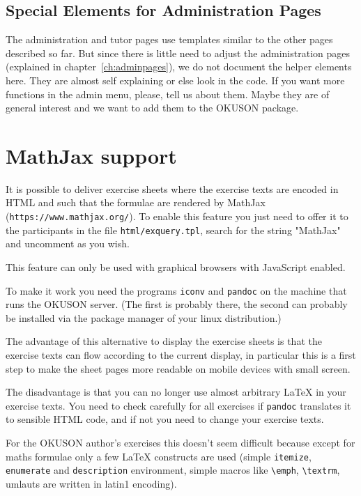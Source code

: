 \documentclass[12pt,openany,a4paper]{book}
\newcommand{\OKUSON}{\textsf{OKUSON}}
\newcommand{\MathJax}{\textsf{MathJax}}
\begin{document}
\subsection{Special Elements for Administration Pages}

The administration and tutor pages use templates similar to the other pages
described so far. But since there is little need to adjust the
administration pages (explained in chapter~\ref{ch:adminpages}), we do not
document the helper elements here. They are almost self explaining or else 
look in the code. If you want more functions in the admin menu, please, tell us
about them. Maybe they are of general interest and we want to add them to
the {\OKUSON} package.

\section{\MathJax{} support}\label{useMathJax}

It is possible to deliver exercise sheets where the exercise texts are
encoded in HTML and such that the formulae are rendered by \MathJax{}
(\texttt{https://www.mathjax.org/}). To enable this feature you just need to
offer it to the participants in the file \texttt{html/exquery.tpl}, search
for the string "MathJax" and uncomment as you wish.

This feature can only be used with graphical browsers with JavaScript
enabled.

To make it work you need the programs \texttt{iconv} and \texttt{pandoc} on
the machine that runs the \OKUSON{}  server. (The first is probably there, the
second can probably be installed via the package manager of your linux
distribution.)

The advantage of this alternative to display the exercise sheets is that the
exercise texts can flow according to the current display, in particular this
is a first step to make the sheet pages more readable on mobile devices with
small screen.

The disadvantage is that you can no longer use almost arbitrary \LaTeX{} in
your exercise texts. You need to check carefully for all exercises if 
\texttt{pandoc} translates it to sensible HTML code, and if not you need to 
change your exercise texts. 

For the \OKUSON{}  author's exercises this doesn't seem difficult because
except for maths formulae only a few \LaTeX{} constructs are used
(simple \texttt{itemize}, \texttt{enumerate} and \texttt{description}
environment, simple macros like \texttt{\textbackslash emph}, 
\texttt{\textbackslash textrm},
umlauts are written in latin1 encoding).
\end{document}
